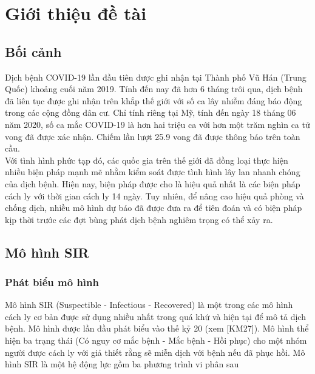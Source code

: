 \documentclass[a4paper]{article}
\begin{document}

\newpage
\tableofcontents
\newpage


\section{Giới thiệu đề tài}
\label{chuan_bi}
\subsection{Bối cảnh} 
\setlength{\parindent}{1cm}
\indent [0.2]Dịch bệnh COVID-19 lần đầu tiên được ghi nhận tại Thành phố Vũ Hán (Trung Quốc) khoảng
cuối năm 2019. Tính đến nay đã hơn 6 tháng trôi qua, dịch bệnh đã liên tục được ghi nhận trên
khắp thế giới với số ca lây nhiễm đáng báo động trong các cộng đồng dân cư. Chỉ tính riêng tại
Mỹ, tính đến ngày 18 tháng 06 năm 2020, số ca mắc COVID-19 là hơn hai triệu ca với hơn một
trăm nghìn ca tử vong đã được xác nhận. Chiếm lần lượt 25.9%
vong đã được thông báo trên toàn cầu.
\\
\indent Với tình hình phức tạp đó, các quốc gia trên thế giới đã đồng loại thực hiện nhiều biện pháp
mạnh mẽ nhằm kiểm soát được tình hình lây lan nhanh chóng của dịch bệnh. Hiện nay, biện
pháp được cho là hiệu quả nhất là các biện pháp cách ly với thời gian cách ly 14 ngày. Tuy nhiên,
để nâng cao hiệu quả phòng và chống dịch, nhiều mô hình dự báo đã được đưa ra để tiên đoán
và có biện pháp kịp thời trước các đợt bùng phát dịch bệnh nghiêm trọng có thể xảy ra.
\subsection{Mô hình SIR}

\subsubsection{Phát biểu mô hình}
Mô hình SIR (Suspectible - Infectious - Recovered) là một trong các mô hình cách ly cơ bản được sử dụng nhiều nhất trong quá khứ và hiện tại để mô tả dịch bệnh. Mô hình được lần đầu
phát biểu vào thế kỷ 20 (xem [KM27]). Mô hình thể hiện ba trạng thái (Có nguy cơ mắc bệnh -
Mắc bệnh - Hồi phục) cho một nhóm người được cách ly với giả thiết rằng sẽ miễn dịch với bệnh
nếu đã phục hồi. Mô hình SIR là một hệ động lực gồm ba phương trình vi phân sau
\end{document}
